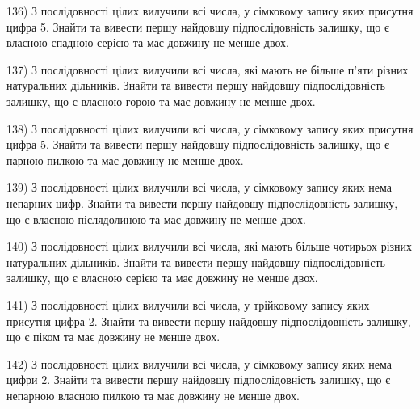 \documentclass[11pt, ukrainian]{article}
\begin{document}
\par
\vspace{0.9cm}
136) \space 
З послідовності цілих вилучили всі числа, у сімковому запису яких присутня цифра 5. Знайти та вивести першу найдовшу підпослідовність залишку, що є власною спадною серією та має довжину не менше двох.

\par
\vspace{0.9cm}
137) \space 
З послідовності цілих вилучили всі числа, які мають не більше п'яти різних натуральних дільників. Знайти та вивести першу найдовшу підпослідовність залишку, що є власною горою та має довжину не менше двох.

\par
\vspace{0.9cm}
138) \space 
З послідовності цілих вилучили всі числа, у сімковому запису яких присутня цифра 5. Знайти та вивести першу найдовшу підпослідовність залишку, що є парною пилкою та має довжину не менше двох.

\par
\vspace{0.9cm}
139) \space 
З послідовності цілих вилучили всі числа, у сімковому запису яких нема непарних цифр. Знайти та вивести першу найдовшу підпослідовність залишку, що є власною післядолиною та має довжину не менше двох.

\par
\vspace{0.9cm}
140) \space 
З послідовності цілих вилучили всі числа, які мають більше чотирьох різних натуральних дільників. Знайти та вивести першу найдовшу підпослідовність залишку, що є власною серією та має довжину не менше двох.

\par
\vspace{0.9cm}
141) \space 
З послідовності цілих вилучили всі числа, у трійковому запису яких присутня цифра 2. Знайти та вивести першу найдовшу підпослідовність залишку, що є піком та має довжину не менше двох.

\par
\vspace{0.9cm}
142) \space 
З послідовності цілих вилучили всі числа, у сімковому запису яких нема цифри 2. Знайти та вивести першу найдовшу підпослідовність залишку, що є непарною власною пилкою та має довжину не менше двох.
\end{document}
